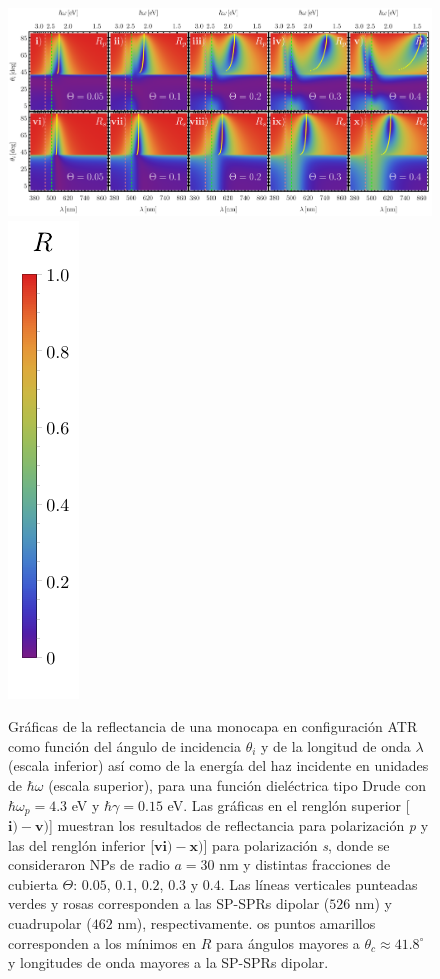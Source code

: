 	\begin{figure}[h!]\centering
\includegraphics[width = .94\linewidth, trim={00 00 00 00}, clip	]{2-Resultados/figs/1-Wp4ThetaVar/0-2D_Grid}%
\includegraphics[scale=.89, trim={00 -5 00 00}, clip]{2-Resultados/figs/0-RBar_v}\vspace*{-.5em}
	\caption{Gráficas de la reflectancia de una monocapa en configuración ATR como función del ángulo de incidencia $\theta_i$ y de la longitud de onda $\lambda$ (escala inferior) así como de la energía del haz incidente en unidades de $\hbar\omega$ (escala superior), para una función dieléctrica tipo Drude con $\hbar\omega_p=4. 3$ eV  y  $\hbar\gamma=0. 15$ eV.  Las gráficas   en el renglón superior [$\mathbf{i)-v)}$]  muestran los resultados de reflectancia para  polarización \emph{p} y las del renglón inferior  [$\mathbf{vi)-x)}$] para polarización  \emph{s}, donde se consideraron NPs de radio $a=30$ nm y distintas fracciones de cubierta $\Theta$: $0. 05$, $0. 1$, $0. 2$, $0. 3$ y $0. 4$. Las líneas verticales punteadas verdes y rosas corresponden a las SP-SPRs dipolar ($526$ nm) y cuadrupolar ($462$ nm), respectivamente.	os puntos amarillos corresponden a los mínimos en $R$ para ángulos mayores a $\theta_c\approx 41.8^\circ$ y longitudes de onda mayores a la SP-SPRs dipolar.}	\label{fig:R-ATR4}	
	\end{figure}	

